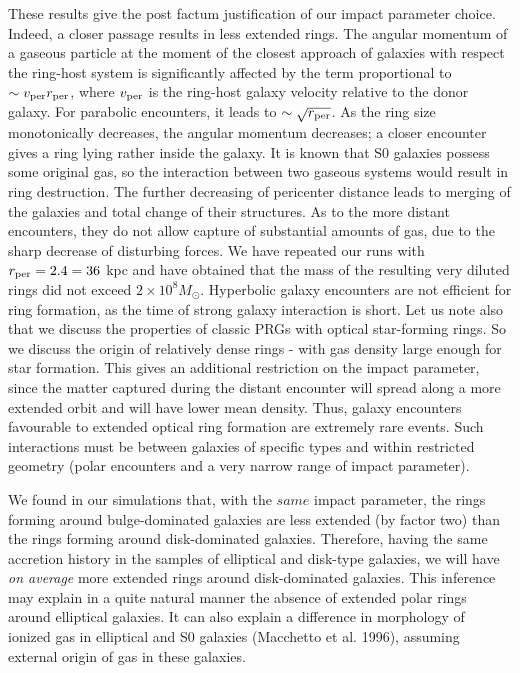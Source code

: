 These results give the post factum justification of our impact 
parameter choice. Indeed, a closer passage results in less extended 
rings. 
The angular momentum of a gaseous particle at the moment of 
the closest approach of galaxies with respect the ring-host 
system is significantly affected by the term 
proportional to $\sim v_{\rm per}r_{\rm per}$, 
where $v_{\rm per}$ is the ring-host galaxy velocity relative to the 
donor galaxy. For parabolic encounters, it leads 
to $\sim \sqrt{r_{\rm per}}$. As the ring size monotonically decreases, 
the angular momentum decreases; a closer encounter gives a 
ring lying  rather inside the galaxy. It is known that S0 galaxies 
possess some original gas, so the interaction between 
two gaseous systems would result in ring destruction. The further 
decreasing of pericenter distance leads to merging of the galaxies and 
total change of their structures. 
As to 
the more distant encounters, they do not allow capture of substantial 
amounts of gas, due to the sharp decrease of disturbing forces. We have 
repeated our runs with $r_{\rm per}=2.4=36$ kpc and have obtained that   
the mass of the resulting very diluted rings did not exceed 
$2\times10^8 M_{\odot}$. Hyperbolic
galaxy encounters are not efficient for 
ring formation, as the time of strong galaxy interaction is short. 
Let us note also that we discuss the properties
of classic PRGs with optical star-forming rings. So we discuss
the origin of relatively dense rings - with gas density large
enough for star formation. This gives an additional restriction on
the impact parameter, since the matter captured during the
distant encounter will spread along a more extended orbit
and will have lower mean density.  
Thus, galaxy encounters favourable to extended 
optical ring formation are extremely rare events. Such interactions
must be between galaxies of specific types and within
restricted geometry (polar encounters and a very narrow range of 
impact parameter). 

We found in our simulations that, with the $same$ impact parameter,
the rings forming around bulge-dominated galaxies are less
extended (by factor two) than the rings forming around disk-dominated
galaxies. Therefore, having the same accretion history in
the samples of elliptical and disk-type galaxies, we will
have {\it on average} more extended rings around disk-dominated
galaxies. This inference may explain 
in a quite natural manner the absence of extended polar rings 
around elliptical galaxies.
It can also explain a difference in morphology of ionized gas in
elliptical and S0 galaxies (Macchetto et al. 1996), assuming 
external origin of gas in these galaxies.

